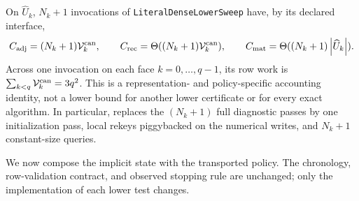 \begin{proposition}
\label{prop:branch-caterpillar-literal-dense-lower-sweep-cost}
On $\widehat U_k$, $N_k+1$ invocations of
\texttt{LiteralDenseLowerSweep} have, by its declared interface,
\begin{equation}
 C_{\rm adj}=(N_k+1)\mathcal V_k^{\rm can},
 \qquad
 C_{\rm rec}=\Theta((N_k+1)\mathcal V_k^{\rm can}),
 \qquad
 C_{\rm mat}=\Theta((N_k+1)\left\lvert \widehat U_k \right\rvert).
 \label{eq:branch-caterpillar-literal-dense-lower-sweep-cost}
\end{equation}
Across one invocation on each face $k=0,\ldots,q-1$, its row work is
$\sum_{k<q}\mathcal V_k^{\rm can}=3q^2$.  This is a representation- and
policy-specific accounting identity, not a lower bound for another lower
certificate or for every exact algorithm.  In particular,
 replaces the
$(N_k+1)$ full diagnostic passes by one initialization pass, local rekeys
piggybacked on the numerical writes, and $N_k+1$ constant-size queries.
\end{proposition}

We now compose the implicit state with the transported policy.  The
chronology, row-validation contract, and observed stopping rule are unchanged;
only the implementation of each lower test changes.


